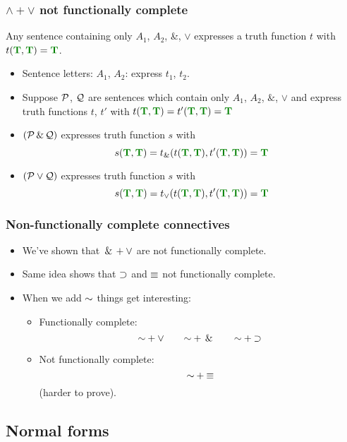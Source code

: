 \begin{frame}
  \frametitle{$\land + \lor$ not functionally complete}

\begin{theorem}
Any sentence containing only $A_1$, $A_2$, \&, $\lor$
  expresses a truth function $t$ with $t(\True, \True) = \True$.
\end{theorem}

\begin{itemize}[<+->]
\item Sentence letters: $A_1$, $A_2$: express $t_1$, $t_2$.
\item Suppose $\mathcal{P}$, $\mathcal{Q}$ are sentences which
  contain only $A_1$, $A_2$, $\&$, $\lor$ and express truth
  functions $t$, $t'$ with $t(\True, \True) = t'(\True, \True) = \True$
\item $(\mathcal{P} \,\&\, \mathcal{Q})$ expresses truth function $s$ with
\[s(\True, \True) = t_\&(t(\True, \True), t'(\True, \True)) = \True\]
\item $(\mathcal{P} \vee \mathcal{Q})$ expresses truth function $s$ with
\[s(\True, \True) = t_\lor(t(\True, \True), t'(\True, \True)) = \True\]
\end{itemize}
\end{frame}

\begin{frame}
  \frametitle{Non-functionally complete connectives}

  \begin{itemize}[<+->]
    \item We've shown that $\,\&\, + \vee$ are not  functionally complete.
    \item Same idea shows that $\supset$ and $\equiv$ not functionally complete.
    \item When we add $\enot$ things get interesting:
    \begin{itemize}[<+->]
      \item Functionally complete:
      \[{\enot} + {\eor} \qquad {\enot} + {\eand} \qquad {\enot} + {\eif}\]
      \item Not functionally complete:
      \[{\enot} + {\eiff}\]
      (harder to prove).
    \end{itemize}
  \end{itemize}
\end{frame}

\subsection{Normal forms}

